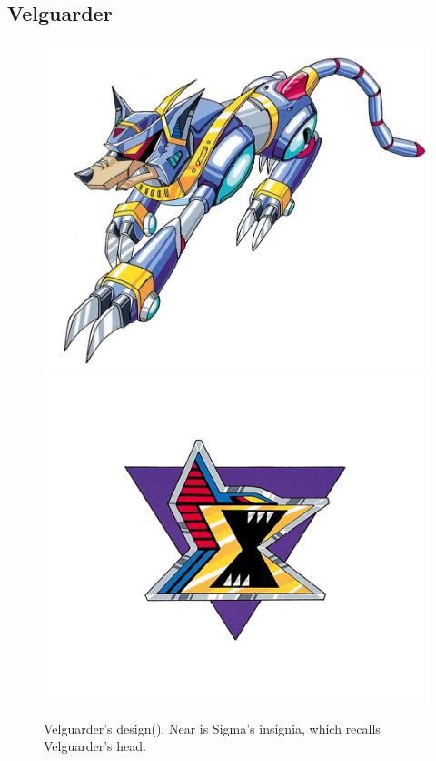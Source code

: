 \subsection{Velguarder}\label{boss:Velguarder}
\begin{figure}[htp]
	\centering
	\includegraphics[height=\portraitsize]{figures/X1/Sigma_stages/Velguarder.jpg}
	\includegraphics[height=\portraitsize]{figures/X1/Sigma_stages/Sigma_logo.png}
	\caption{Velguarder's design(\cite{book:MMX_Complete_art}). Near is Sigma's insignia, which recalls Velguarder's head.}
\end{figure}

